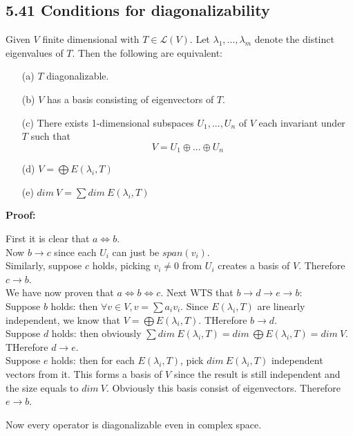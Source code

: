 \documentclass{article}
\begin{document}
\subsection*{5.41 Conditions for diagonalizability}
Given $V$ finite dimensional with $T \in \mathcal{L}(V)$. Let $\lambda_1, ..., \lambda_m$ denote the distinct eigenvalues of $T$. Then the following are equivalent:
\begin{itemize}
    \item[(a)] $T$ diagonalizable.
    \item[(b)] $V$ has a basis consisting of eigenvectors of $T$.
    \item[(c)] There exists 1-dimensional subspaces $U_1, ..., U_n$ of $V$ each invariant under $T$ such that
    \begin{equation*}
        V = U_1 \oplus ... \oplus U_n
    \end{equation*}
    \item[(d)] $V = \bigoplus E(\lambda_i, T)$
    \item[(e)] $dim\ V = \sum dim\ E(\lambda_i, T)$
\end{itemize}
\textbf{Proof:}
\begin{addmargin}[1em]{0em}
    First it is clear that $a \iff b$.\\
    Now $b \rightarrow c$ since each $U_i$ can just be $span(v_i)$.\\
    Similarly, suppose $c$ holds, picking $v_i \neq 0$ from $U_i$ creates a basis of $V$. Therefore $c \rightarrow b$.\\
    We have now proven that $a \iff b \iff c$. Next WTS that $b \rightarrow d \rightarrow e \rightarrow b$:\\
    Suppose $b$ holds: then $\forall v \in V, v = \sum a_iv_i$. Since $E(\lambda_i, T)$ are linearly independent, we know that $V = \bigoplus E(\lambda_i, T)$. THerefore $b \rightarrow d$.\\
    Suppose $d$ holds: then obviously $\sum dim\ E(\lambda_i, T) = dim\ \bigoplus E(\lambda_i, T) = dim\ V$. THerefore $d \rightarrow e$.\\
    Suppose $e$ holds: then for each $E(\lambda_i, T)$, pick $dim\ E(\lambda_i, T)$ independent vectors from it. This forms a basis of $V$ since the result is still independent and the size equals to $dim\ V$. Obviously this basis consist of eigenvectors. Therefore $e \rightarrow b$.
\end{addmargin}
Now every operator is diagonalizable even in complex space.
\end{document}
